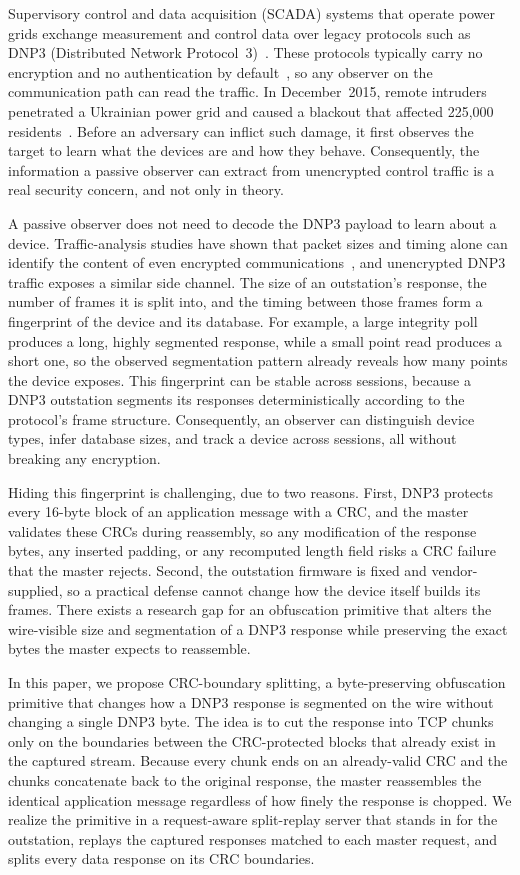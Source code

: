 \documentclass[conference]{IEEEtran}
\begin{document}
Supervisory control and data acquisition (SCADA) systems that operate power grids
exchange measurement and control data over legacy protocols such as DNP3
(Distributed Network Protocol~3)~\cite{ref:dnp3}. These protocols typically carry
no encryption and no authentication by default~\cite{ref:dnp3}, so any observer on
the communication path can read the traffic. In December~2015, remote intruders
penetrated a Ukrainian power grid and caused a blackout that affected 225{,}000
residents~\cite{ref:ukraine}. Before an adversary can inflict such damage, it
first observes the target to learn what the devices are and how they behave.
Consequently, the information a passive observer can extract from unencrypted
control traffic is a real security concern, and not only in theory.

A passive observer does not need to decode the DNP3 payload to learn about a
device. Traffic-analysis studies have shown that packet sizes and timing alone
can identify the content of even encrypted communications~\cite{ref:fp}, and
unencrypted DNP3 traffic exposes a similar side channel. The size of an
outstation's response, the number of frames it is split into, and the timing
between those frames form a fingerprint of the device and its database. For
example, a large integrity poll produces a long, highly segmented response, while
a small point read produces a short one, so the observed segmentation pattern
already reveals how many points the device exposes. This fingerprint can be
stable across sessions, because a DNP3 outstation segments its responses
deterministically according to the protocol's frame structure. Consequently, an
observer can distinguish device types, infer database sizes, and track a device
across sessions, all without breaking any encryption.

Hiding this fingerprint is challenging, due to two reasons. First, DNP3 protects
every 16-byte block of an application message with a CRC, and the master
validates these CRCs during reassembly, so any modification of the response
bytes, any inserted padding, or any recomputed length field risks a CRC failure
that the master rejects. Second, the outstation firmware is fixed and
vendor-supplied, so a practical defense cannot change how the device itself
builds its frames. There exists a research gap for an obfuscation primitive that
alters the wire-visible size and segmentation of a DNP3 response while preserving
the exact bytes the master expects to reassemble.

In this paper, we propose CRC-boundary splitting, a byte-preserving obfuscation
primitive that changes how a DNP3 response is segmented on the wire without
changing a single DNP3 byte. The idea is to cut the response into TCP chunks only
on the boundaries between the CRC-protected blocks that already exist in the
captured stream. Because every chunk ends on an already-valid CRC and the chunks
concatenate back to the original response, the master reassembles the identical
application message regardless of how finely the response is chopped. We realize
the primitive in a request-aware split-replay server that stands in for the
outstation, replays the captured responses matched to each master request, and
splits every data response on its CRC boundaries.
\end{document}
